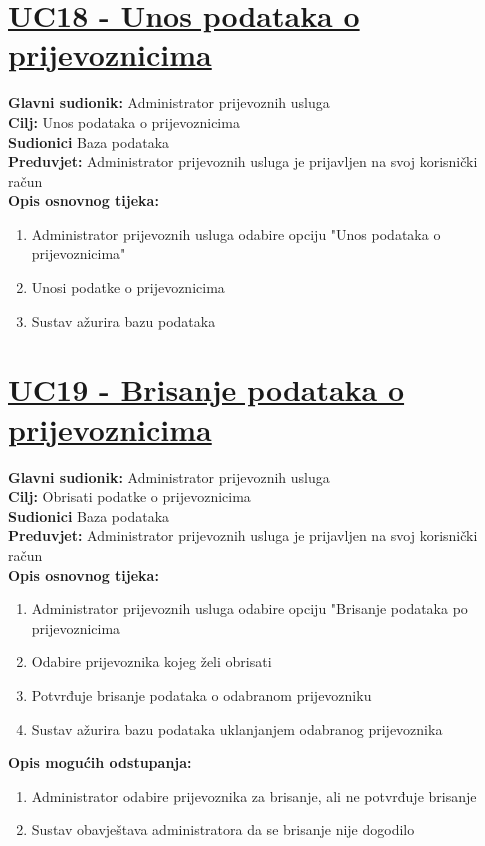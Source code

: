 \documentclass{article}
\begin{document}
	\section* {\underline{UC18 - Unos podataka o prijevoznicima}}
	\textbf{Glavni sudionik:} Administrator prijevoznih usluga \\
	\textbf{Cilj:} Unos podataka o prijevoznicima\\
	\textbf{Sudionici} Baza podataka \\
	\textbf{Preduvjet:} Administrator prijevoznih usluga je prijavljen na svoj korisnički račun \\
	\textbf{Opis osnovnog tijeka:}
	\begin{enumerate}
		\item Administrator prijevoznih usluga odabire opciju "Unos podataka o prijevoznicima"
		\item Unosi podatke o prijevoznicima
		\item Sustav ažurira bazu podataka
	\end{enumerate}
	
	\section* {\underline{UC19 - Brisanje podataka o prijevoznicima}}
	\textbf{Glavni sudionik:} Administrator prijevoznih usluga \\
	\textbf{Cilj:} Obrisati podatke o prijevoznicima\\
	\textbf{Sudionici} Baza podataka \\
	\textbf{Preduvjet:} Administrator prijevoznih usluga je prijavljen na svoj korisnički račun \\
	\textbf{Opis osnovnog tijeka:}
	\begin{enumerate}
		\item Administrator prijevoznih usluga odabire opciju "Brisanje podataka po prijevoznicima
		\item Odabire prijevoznika kojeg želi obrisati
		\item Potvrđuje brisanje podataka o odabranom prijevozniku
		\item Sustav ažurira bazu podataka uklanjanjem odabranog prijevoznika
	\end{enumerate}
	\textbf{Opis mogućih odstupanja:}
	\begin{enumerate}
		\item Administrator odabire prijevoznika za brisanje, ali ne potvrđuje brisanje
		\item Sustav obavještava administratora da se brisanje nije dogodilo
	\end{enumerate}
	
\end{document}
